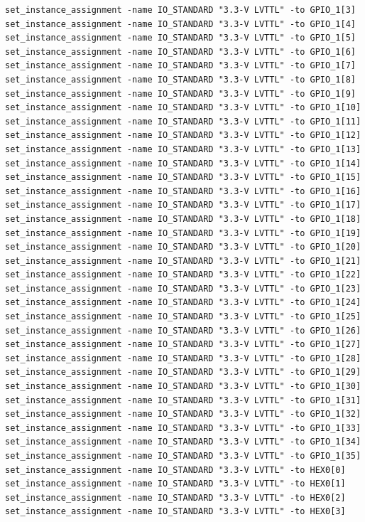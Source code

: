 \documentclass[conference]{IEEEtran}
\begin{document}
\begin{lstlisting}
set_instance_assignment -name IO_STANDARD "3.3-V LVTTL" -to GPIO_1[3]
set_instance_assignment -name IO_STANDARD "3.3-V LVTTL" -to GPIO_1[4]
set_instance_assignment -name IO_STANDARD "3.3-V LVTTL" -to GPIO_1[5]
set_instance_assignment -name IO_STANDARD "3.3-V LVTTL" -to GPIO_1[6]
set_instance_assignment -name IO_STANDARD "3.3-V LVTTL" -to GPIO_1[7]
set_instance_assignment -name IO_STANDARD "3.3-V LVTTL" -to GPIO_1[8]
set_instance_assignment -name IO_STANDARD "3.3-V LVTTL" -to GPIO_1[9]
set_instance_assignment -name IO_STANDARD "3.3-V LVTTL" -to GPIO_1[10]
set_instance_assignment -name IO_STANDARD "3.3-V LVTTL" -to GPIO_1[11]
set_instance_assignment -name IO_STANDARD "3.3-V LVTTL" -to GPIO_1[12]
set_instance_assignment -name IO_STANDARD "3.3-V LVTTL" -to GPIO_1[13]
set_instance_assignment -name IO_STANDARD "3.3-V LVTTL" -to GPIO_1[14]
set_instance_assignment -name IO_STANDARD "3.3-V LVTTL" -to GPIO_1[15]
set_instance_assignment -name IO_STANDARD "3.3-V LVTTL" -to GPIO_1[16]
set_instance_assignment -name IO_STANDARD "3.3-V LVTTL" -to GPIO_1[17]
set_instance_assignment -name IO_STANDARD "3.3-V LVTTL" -to GPIO_1[18]
set_instance_assignment -name IO_STANDARD "3.3-V LVTTL" -to GPIO_1[19]
set_instance_assignment -name IO_STANDARD "3.3-V LVTTL" -to GPIO_1[20]
set_instance_assignment -name IO_STANDARD "3.3-V LVTTL" -to GPIO_1[21]
set_instance_assignment -name IO_STANDARD "3.3-V LVTTL" -to GPIO_1[22]
set_instance_assignment -name IO_STANDARD "3.3-V LVTTL" -to GPIO_1[23]
set_instance_assignment -name IO_STANDARD "3.3-V LVTTL" -to GPIO_1[24]
set_instance_assignment -name IO_STANDARD "3.3-V LVTTL" -to GPIO_1[25]
set_instance_assignment -name IO_STANDARD "3.3-V LVTTL" -to GPIO_1[26]
set_instance_assignment -name IO_STANDARD "3.3-V LVTTL" -to GPIO_1[27]
set_instance_assignment -name IO_STANDARD "3.3-V LVTTL" -to GPIO_1[28]
set_instance_assignment -name IO_STANDARD "3.3-V LVTTL" -to GPIO_1[29]
set_instance_assignment -name IO_STANDARD "3.3-V LVTTL" -to GPIO_1[30]
set_instance_assignment -name IO_STANDARD "3.3-V LVTTL" -to GPIO_1[31]
set_instance_assignment -name IO_STANDARD "3.3-V LVTTL" -to GPIO_1[32]
set_instance_assignment -name IO_STANDARD "3.3-V LVTTL" -to GPIO_1[33]
set_instance_assignment -name IO_STANDARD "3.3-V LVTTL" -to GPIO_1[34]
set_instance_assignment -name IO_STANDARD "3.3-V LVTTL" -to GPIO_1[35]
set_instance_assignment -name IO_STANDARD "3.3-V LVTTL" -to HEX0[0]
set_instance_assignment -name IO_STANDARD "3.3-V LVTTL" -to HEX0[1]
set_instance_assignment -name IO_STANDARD "3.3-V LVTTL" -to HEX0[2]
set_instance_assignment -name IO_STANDARD "3.3-V LVTTL" -to HEX0[3]

\end{lstlisting}
\end{document}
